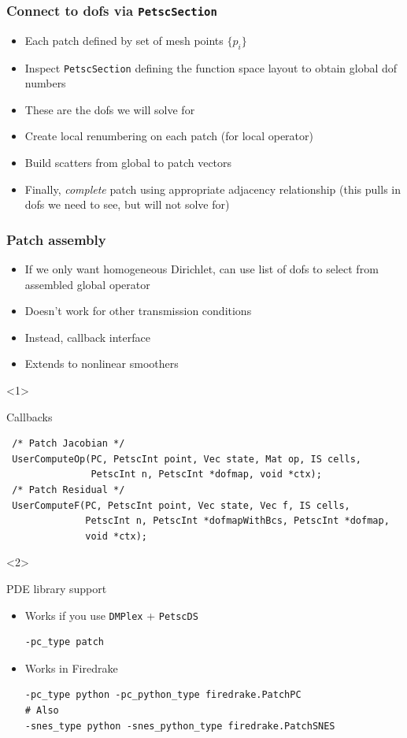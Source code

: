 \documentclass[presentation,aspectratio=43, 10pt]{beamer}
\begin{document}
\begin{frame}
  \frametitle{Connect to dofs via \texttt{PetscSection}}
  \begin{itemize}
  \item Each patch defined by set of mesh points $\{p_i\}$
  \item Inspect \texttt{PetscSection} defining the function space
    layout to obtain global dof numbers
  \item These are the dofs we will solve for
  \item Create local renumbering on each patch (for local operator)
  \item Build scatters from global to patch vectors
  \item Finally, \emph{complete} patch using appropriate adjacency
    relationship (this pulls in dofs we need to see, but will not
    solve for)
  \end{itemize}
\end{frame}
\begin{frame}[fragile,t]
  \frametitle{Patch assembly}
  \begin{itemize}
  \item If we only want homogeneous Dirichlet, can use list of dofs to
    select from assembled global operator
  \item Doesn't work for other transmission conditions
  \item Instead, callback interface
  \item Extends to nonlinear smoothers
  \end{itemize}

  \begin{onlyenv}<1>
    \begin{block}{Callbacks}
\begin{verbatim}
 /* Patch Jacobian */
 UserComputeOp(PC, PetscInt point, Vec state, Mat op, IS cells,
               PetscInt n, PetscInt *dofmap, void *ctx);
 /* Patch Residual */
 UserComputeF(PC, PetscInt point, Vec state, Vec f, IS cells,
              PetscInt n, PetscInt *dofmapWithBcs, PetscInt *dofmap,
              void *ctx);
\end{verbatim}
    \end{block}
  \end{onlyenv}
  \begin{onlyenv}<2>
    \begin{block}{PDE library support}
      \begin{itemize}
      \item Works if you use \texttt{DMPlex} + \texttt{PetscDS}
\begin{verbatim}
-pc_type patch
\end{verbatim}
      \item Works in Firedrake
\begin{verbatim}
-pc_type python -pc_python_type firedrake.PatchPC
# Also
-snes_type python -snes_python_type firedrake.PatchSNES
\end{verbatim}
      \end{itemize}
    \end{block}
  \end{onlyenv}
\end{frame}
\end{document}
